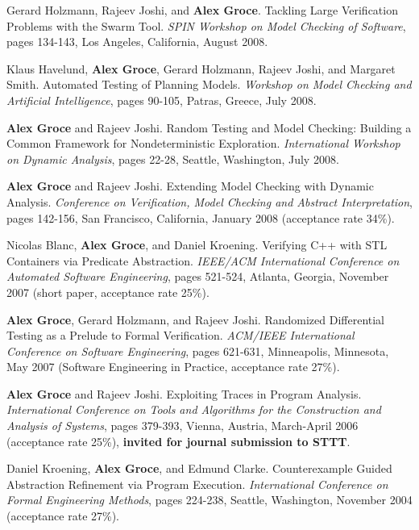 \documentclass[ComputerScience]{vita}
\begin{document}
\begin{vita}
\begin{Refereed Conference and Workshop Publications}
\item
Gerard Holzmann, Rajeev Joshi, and {\bf Alex Groce}.
\newblock Tackling Large Verification Problems with the Swarm Tool.
\newblock \emph{SPIN Workshop on Model Checking of Software}, pages 134-143, Los Angeles, California, August 2008.

\item
Klaus Havelund, {\bf Alex Groce}, Gerard Holzmann, Rajeev Joshi, and Margaret Smith.
\newblock Automated Testing of Planning Models.
\newblock \emph{Workshop on Model Checking and Artificial Intelligence}, pages 90-105, Patras, Greece, July 2008.

\item
{\bf Alex Groce} and Rajeev Joshi.
\newblock Random Testing and Model Checking:   Building a Common Framework for Nondeterministic Exploration.
\newblock \emph{International Workshop on Dynamic Analysis}, pages 22-28, Seattle, Washington, July 2008.

\item
{\bf Alex Groce} and Rajeev Joshi.
\newblock Extending Model Checking with Dynamic Analysis.
\newblock \emph{Conference on Verification, Model Checking and Abstract Interpretation}, pages 142-156, San Francisco, California, January 2008 (acceptance rate 34\%).

\item
Nicolas Blanc, {\bf Alex Groce}, and Daniel Kroening.
\newblock Verifying C++ with STL Containers via Predicate Abstraction.
\newblock \emph{IEEE/ACM International Conference on Automated Software Engineering}, pages 521-524, Atlanta, Georgia, November 2007 (short paper, acceptance rate 25\%).

\item
{\bf Alex Groce}, Gerard Holzmann, and Rajeev Joshi.
\newblock Randomized Differential Testing as a Prelude to Formal Verification.
\newblock \emph{ACM/IEEE International Conference on Software Engineering}, pages 621-631, Minneapolis, Minnesota, May 2007 (Software Engineering in Practice, acceptance rate 27\%).

\item
{\bf Alex Groce} and Rajeev Joshi.
\newblock Exploiting Traces in Program Analysis.
\newblock \emph{International Conference on Tools and Algorithms for the Construction and Analysis of Systems}, pages 379-393, Vienna, Austria, March-April 2006 (acceptance rate 25\%), {\bf invited for journal submission to STTT}.

\item
Daniel Kroening, {\bf Alex Groce}, and Edmund Clarke.
\newblock Counterexample Guided Abstraction Refinement via Program Execution.
\newblock \emph{International Conference on
   Formal Engineering Methods},  pages 224-238, Seattle, Washington, November 2004 (acceptance rate 27\%).


\end{Refereed Conference and Workshop Publications}
\end{vita}
\end{document}
